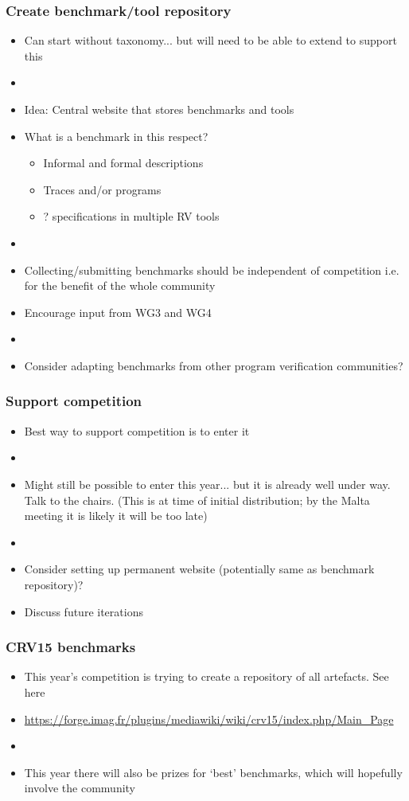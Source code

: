 \documentclass{beamer}
\begin{document}
\begin{frame}
\frametitle{Create benchmark/tool repository}
\begin{itemize}
	\item Can start without taxonomy... but will need to be able to extend to support this
	\item[]
	\item Idea: Central website that stores benchmarks and tools
	\item What is a benchmark in this respect?
	\begin{itemize}
		\item Informal and formal descriptions
		\item Traces and/or programs
		\item ? specifications in multiple RV tools
	\end{itemize}
	\item[]
	\item Collecting/submitting benchmarks should be independent of competition i.e. for the benefit of the whole community
	\item Encourage input from WG3 and WG4
	\item[]
	\item Consider adapting benchmarks from other program verification communities?
\end{itemize}
\end{frame}

\begin{frame}
\frametitle{Support competition}
\begin{itemize}
	\item Best way to support competition is to enter it
	\item[]
	\item Might still be possible to enter this year... but it is already well under way. Talk to the chairs. (This is at time of initial distribution; by the Malta meeting it is likely it will be too late)
	\item[]
	\item Consider setting up permanent website (potentially same as benchmark repository)?
	\item Discuss future iterations
\end{itemize}
\end{frame}

\begin{frame}
\frametitle{CRV15 benchmarks}
\begin{itemize}
	\item This year's competition is trying to create a repository of all artefacts. See here
	\item[] \url{https://forge.imag.fr/plugins/mediawiki/wiki/crv15/index.php/Main_Page}
	\item[]
	\item This year there will also be prizes for `best' benchmarks, which will hopefully involve the community
\end{itemize}
\end{frame}
\end{document}
